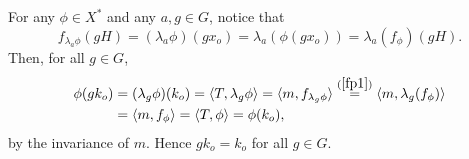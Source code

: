For any $\phi\in X^*$ and any $a, g\in G$, notice that
\begin{equation}\label{fp1}
f_{\lambda_a \phi}(gH) = (\lambda_a \phi)(g x_o) =  \lambda_a(\phi(g x_o)) =  \lambda_a(f_\phi)(gH).
\end{equation}
Then, for all $g \in G$,
\begin{align*}
\phi(g k_o) &= (\lambda_g \phi)(k_o) = \langle T, \lambda_g \phi \rangle = \langle m, f_{\lambda_g \phi} \rangle
\stackrel{(\ref{fp1})}{=} \langle m, \lambda_g (f_\phi) \rangle \\
&= \langle m, f_\phi \rangle = \langle T, \phi \rangle = \phi(k_o),
\end{align*}
by the invariance of $m$.
Hence $g k_o = k_o$ for all $g\in G$.
\done
